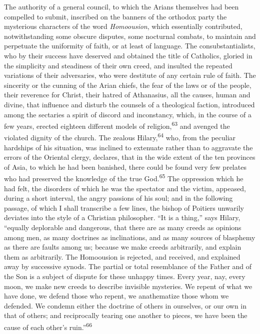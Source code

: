 The authority of a general council, to which the Arians
themselves had been compelled to submit, inscribed on the banners
of the orthodox party the mysterious characters of the word
\textit{Homoousion}, which essentially contributed, notwithstanding some
obscure disputes, some nocturnal combats, to maintain and
perpetuate the uniformity of faith, or at least of language. The
consubstantialists, who by their success have deserved and
obtained the title of Catholics, gloried in the simplicity and
steadiness of their own creed, and insulted the repeated
variations of their adversaries, who were destitute of any
certain rule of faith. The sincerity or the cunning of the Arian
chiefs, the fear of the laws or of the people, their reverence
for Christ, their hatred of Athanasius, all the causes, human and
divine, that influence and disturb the counsels of a theological
faction, introduced among the sectaries a spirit of discord and
inconstancy, which, in the course of a few years, erected
eighteen different models of religion,\textsuperscript{63} and avenged the
violated dignity of the church. The zealous Hilary,\textsuperscript{64} who, from
the peculiar hardships of his situation, was inclined to
extenuate rather than to aggravate the errors of the Oriental
clergy, declares, that in the wide extent of the ten provinces of
Asia, to which he had been banished, there could be found very
few prelates who had preserved the knowledge of the true God.\textsuperscript{65}
The oppression which he had felt, the disorders of which he was
the spectator and the victim, appeased, during a short interval,
the angry passions of his soul; and in the following passage, of
which I shall transcribe a few lines, the bishop of Poitiers
unwarily deviates into the style of a Christian philosopher. “It
is a thing,” says Hilary, “equally deplorable and dangerous, that
there are as many creeds as opinions among men, as many doctrines
as inclinations, and as many sources of blasphemy as there are
faults among us; because we make creeds arbitrarily, and explain
them as arbitrarily. The Homoousion is rejected, and received,
and explained away by successive synods. The partial or total
resemblance of the Father and of the Son is a subject of dispute
for these unhappy times. Every year, nay, every moon, we make new
creeds to describe invisible mysteries. We repent of what we have
done, we defend those who repent, we anathematize those whom we
defended. We condemn either the doctrine of others in ourselves,
or our own in that of others; and reciprocally tearing one
another to pieces, we have been the cause of each other’s ruin.”\textsuperscript{66}

